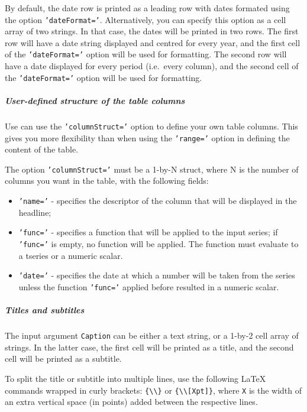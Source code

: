  By default, the date row is printed as a leading row with dates formated
 using the option \texttt{'dateFormat='}. Alternatively, you can specify
 this option as a cell array of two strings. In that case, the dates will
 be printed in two rows. The first row will have a date string displayed
 and centred for every year, and the first cell of the
 \texttt{'dateFormat='} option will be used for formatting. The second
 row will have a date displayed for every period (i.e.~every column), and
 the second cell of the \texttt{'dateFormat='} option will be used for
 formatting.
 
 \subparagraph{User-defined structure of the table columns}
 
 Use can use the \texttt{'columnStruct='} option to define your own table
 columns. This gives you more flexibility than when using the
 \texttt{'range='} option in defining the content of the table.
 
 The option \texttt{'columnStruct='} must be a 1-by-N struct, where N is
 the number of columns you want in the table, with the following fields:
 
 \begin{itemize}
 \item
   \texttt{'name='} - specifies the descriptor of the column that will be
   displayed in the headline;
 \item
   \texttt{'func='} - specifies a function that will be applied to the
   input series; if \texttt{'func='} is empty, no function will be
   applied. The function must evaluate to a tseries or a numeric scalar.
 \item
   \texttt{'date='} - specifies the date at which a number will be taken
   from the series unless the function \texttt{'func='} applied before
   resulted in a numeric scalar.
 \end{itemize}
 
 \subparagraph{Titles and subtitles}
 
 The input argument \texttt{Caption} can be either a text string, or a
 1-by-2 cell array of strings. In the latter case, the first cell will be
 printed as a title, and the second cell will be printed as a subtitle.
 
 To split the title or subtitle into multiple lines, use the following
 LaTeX commands wrapped in curly brackets:
 \texttt{\{\textbackslash{}\textbackslash{}\}} or
 \texttt{\{\textbackslash{}\textbackslash{}{[}Xpt{]}\}}, where \texttt{X}
 is the width of an extra vertical space (in points) added between the
 respective lines.
 
